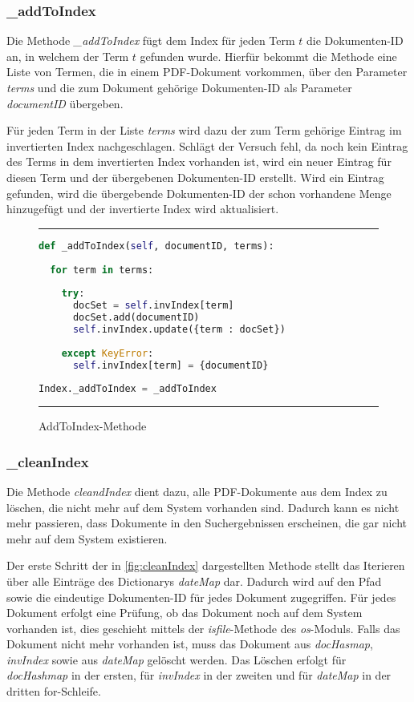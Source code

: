 \subsubsection{\_addToIndex}\label{addtoindex}

Die Methode \textit{\_addToIndex} fügt dem Index für jeden Term $t$ die Dokumenten-ID an, in welchem der Term $t$ gefunden wurde.  Hierfür bekommt die Methode eine Liste von Termen, die in einem PDF-Dokument vorkommen, über den Parameter \textit{terms} und die zum Dokument gehörige Dokumenten-ID als Parameter \textit{documentID} übergeben.

Für jeden Term in der Liste \emph{terms} wird dazu der zum Term gehörige Eintrag im invertierten Index nachgeschlagen. Schlägt der Versuch fehl, da noch kein Eintrag des Terms in dem invertierten Index vorhanden ist, wird ein neuer Eintrag für diesen Term und der übergebenen Dokumenten-ID erstellt. Wird ein Eintrag gefunden, wird die übergebende Dokumenten-ID der schon vorhandene Menge hinzugefügt und der invertierte Index wird aktualisiert.

\begin{figure}
	\rule{\textwidth}{0.4pt}
		\begin{lstlisting}[language=Python]
def _addToIndex(self, documentID, terms):
    
  for term in terms:
        
    try:
      docSet = self.invIndex[term]
      docSet.add(documentID)
      self.invIndex.update({term : docSet})
            
    except KeyError:
      self.invIndex[term] = {documentID}
    
Index._addToIndex = _addToIndex
		\end{lstlisting}
	\rule{\textwidth}{0.4pt}
	\caption{AddToIndex-Methode}
	\label{fig:addToIndex}
\end{figure}


\subsubsection{\_cleanIndex}\label{cleanIndex}
Die Methode \textit{cleandIndex} dient dazu, alle PDF-Dokumente aus dem Index zu löschen, die nicht mehr auf dem System vorhanden sind. Dadurch kann es nicht mehr passieren, dass Dokumente in den Suchergebnissen erscheinen, die gar nicht mehr auf dem System existieren.

Der erste Schritt der in \ref{fig:cleanIndex} dargestellten Methode stellt das Iterieren über alle Einträge des Dictionarys \textit{dateMap} dar. Dadurch wird auf den Pfad sowie die eindeutige Dokumenten-ID für jedes Dokument zugegriffen.
Für jedes Dokument erfolgt eine Prüfung, ob das Dokument noch auf dem System vorhanden ist, dies geschieht mittels der \textit{isfile}-Methode des \textit{os}-Moduls. Falls das Dokument nicht mehr vorhanden ist, muss das Dokument aus \textit{docHasmap}, \textit{invIndex} sowie aus \textit{dateMap} gelöscht werden. 
Das Löschen erfolgt für \textit{docHashmap} in der ersten, für \textit{invIndex} in der zweiten und für \textit{dateMap} in der dritten for-Schleife.

